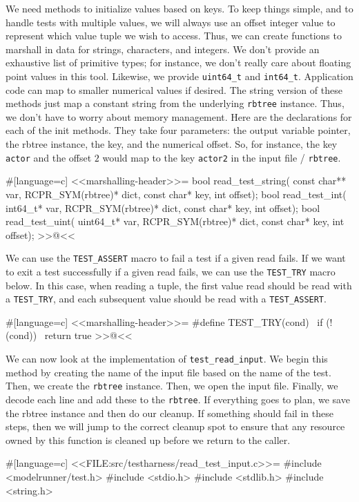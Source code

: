 {We need methods to initialize values based on keys. To keep things simple, and
to handle tests with multiple values, we will always use an offset integer value
to represent which value tuple we wish to access.  Thus, we can create functions
to marshall in data for strings, characters, and integers.  We don't provide an
exhaustive list of primitive types; for instance, we don't really care about
floating point values in this tool.  Likewise, we provide \verb/uint64_t/ and
\verb/int64_t/. Application code can map to smaller numerical values if desired.
The string version of these methods just map a constant string from the
underlying \verb/rbtree/ instance. Thus, we don't have to worry about memory
management.  Here are the declarations for each of the init methods.  They take
four parameters: the output variable pointer, the rbtree instance, the key, and
the numerical offset.  So, for instance, the key \verb/actor/ and the offset $2$
would map to the key \verb/actor2/ in the input file / \verb/rbtree/.

#[language=c]
<<marshalling-header>>=
bool read_test_string(
    const char** var, RCPR_SYM(rbtree)* dict, const char* key, int offset);
bool read_test_int(
    int64_t* var, RCPR_SYM(rbtree)* dict, const char* key, int offset);
bool read_test_uint(
    uint64_t* var, RCPR_SYM(rbtree)* dict, const char* key, int offset);
>>@<<

We can use the \verb/TEST_ASSERT/ macro to fail a test if a given read fails. If
we want to exit a test successfully if a given read fails, we can use the
\verb/TEST_TRY/ macro below.  In this case, when reading a tuple, the first
value read should be read with a \verb/TEST_TRY/, and each subsequent value
should be read with a \verb/TEST_ASSERT/.

#[language=c]
<<marshalling-header>>=
#define TEST_TRY(cond) \
    if (!(cond)) \
        return true
>>@<<

We can now look at the implementation of \verb/test_read_input/. We begin this
method by creating the name of the input file based on the name of the test.
Then, we create the \verb/rbtree/ instance. Then, we open the input file.
Finally, we decode each line and add these to the \verb/rbtree/. If everything
goes to plan, we save the rbtree instance and then do our cleanup. If something
should fail in these steps, then we will jump to the correct cleanup spot to
ensure that any resource owned by this function is cleaned up before we return
to the caller.

#[language=c]
<<FILE:src/testharness/read_test_input.c>>=
#include <modelrunner/test.h>
#include <stdio.h>
#include <stdlib.h>
#include <string.h>

}
